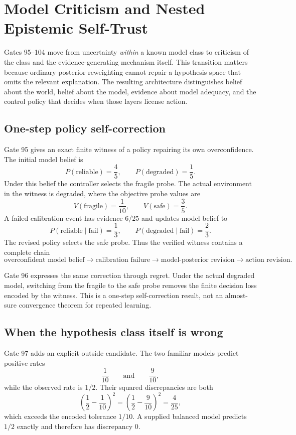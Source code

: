 \section{Model Criticism and Nested Epistemic Self-Trust}

Gates 95--104 move from uncertainty \emph{within} a known model class to criticism of the class and the evidence-generating mechanism itself. This transition matters because ordinary posterior reweighting cannot repair a hypothesis space that omits the relevant explanation. The resulting architecture distinguishes belief about the world, belief about the model, evidence about model adequacy, and the control policy that decides when those layers license action.

\subsection{One-step policy self-correction}

Gate 95 gives an exact finite witness of a policy repairing its own overconfidence. The initial model belief is
\[
P(\mathrm{reliable})=\frac45,
\qquad
P(\mathrm{degraded})=\frac15.
\]
Under this belief the controller selects the fragile probe. The actual environment in the witness is degraded, where the objective probe values are
\[
V(\mathrm{fragile})=\frac1{10},
\qquad
V(\mathrm{safe})=\frac35.
\]
A failed calibration event has evidence $6/25$ and updates model belief to
\[
P(\mathrm{reliable}\mid\mathrm{fail})=\frac13,
\qquad
P(\mathrm{degraded}\mid\mathrm{fail})=\frac23.
\]
The revised policy selects the safe probe. Thus the verified witness contains a complete chain
\[
\text{overconfident model belief}
\longrightarrow
\text{calibration failure}
\longrightarrow
\text{model-posterior revision}
\longrightarrow
\text{action revision}.
\]

Gate 96 expresses the same correction through regret. Under the actual degraded model, switching from the fragile to the safe probe removes the finite decision loss encoded by the witness. This is a one-step self-correction result, not an almost-sure convergence theorem for repeated learning.

\subsection{When the hypothesis class itself is wrong}

Gate 97 adds an explicit outside candidate. The two familiar models predict positive rates
\[
\frac1{10}
\qquad\text{and}\qquad
\frac9{10},
\]
while the observed rate is $1/2$. Their squared discrepancies are both
\[
\left(\frac12-\frac1{10}\right)^2
=
\left(\frac12-\frac9{10}\right)^2
=
\frac4{25},
\]
which exceeds the encoded tolerance $1/10$. A supplied balanced model predicts $1/2$ exactly and therefore has discrepancy $0$.

